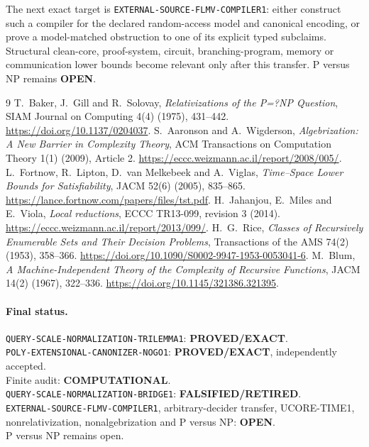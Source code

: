 \documentclass[11pt]{article}
\newcommand{\EXACT}{\textbf{PROVED/EXACT}}
\newcommand{\OPEN}{\textbf{OPEN}}
\newcommand{\RETIRED}{\textbf{FALSIFIED/RETIRED}}
\newcommand{\COMP}{\textbf{COMPUTATIONAL}}
\begin{document}
The next exact target is \texttt{EXTERNAL-SOURCE-FLMV-COMPILER1}: either
construct such a compiler for the declared random-access model and canonical
encoding, or prove a model-matched obstruction to one of its explicit typed
subclaims.  Structural clean-core, proof-system, circuit, branching-program,
memory or communication lower bounds become relevant only after this
transfer.  P versus NP remains \OPEN.

\begin{thebibliography}{9}
 T.~Baker, J.~Gill and R.~Solovay,
\emph{Relativizations of the P=?NP Question}, SIAM Journal on Computing
4(4) (1975), 431--442. \url{https://doi.org/10.1137/0204037}.
 S.~Aaronson and A.~Wigderson,
\emph{Algebrization: A New Barrier in Complexity Theory}, ACM Transactions
on Computation Theory 1(1) (2009), Article 2.
\url{https://eccc.weizmann.ac.il/report/2008/005/}.
 L.~Fortnow, R.~Lipton, D.~van Melkebeek and A.~Viglas,
\emph{Time--Space Lower Bounds for Satisfiability}, JACM 52(6) (2005),
835--865. \url{https://lance.fortnow.com/papers/files/tst.pdf}.
 H.~Jahanjou, E.~Miles and E.~Viola,
\emph{Local reductions}, ECCC TR13-099, revision 3 (2014).
\url{https://eccc.weizmann.ac.il/report/2013/099/}.
 H.~G.~Rice,
\emph{Classes of Recursively Enumerable Sets and Their Decision Problems},
Transactions of the AMS 74(2) (1953), 358--366.
\url{https://doi.org/10.1090/S0002-9947-1953-0053041-6}.
 M.~Blum,
\emph{A Machine-Independent Theory of the Complexity of Recursive Functions},
JACM 14(2) (1967), 322--336.
\url{https://doi.org/10.1145/321386.321395}.
\end{thebibliography}

\paragraph{Final status.}
\texttt{QUERY-SCALE-NORMALIZATION-TRILEMMA1}: \EXACT.\\
\texttt{POLY-EXTENSIONAL-CANONIZER-NOGO1}: \EXACT, independently accepted.\\
Finite audit: \COMP.\\
\texttt{QUERY-SCALE-NORMALIZATION-BRIDGE1}: \RETIRED.\\
\texttt{EXTERNAL-SOURCE-FLMV-COMPILER1}, arbitrary-decider transfer,
UCORE-TIME1, nonrelativization, nonalgebrization and P versus NP: \OPEN.\\
P versus NP remains open.

\end{document}
